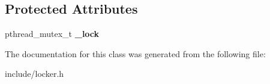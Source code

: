 \subsection*{Protected Attributes}
\begin{DoxyCompactItemize}
\item 
pthread\+\_\+mutex\+\_\+t {\bfseries \+\_\+lock}\hypertarget{class_locker_ac54c95aad09ef586cf91999f662f5b09}{}\label{class_locker_ac54c95aad09ef586cf91999f662f5b09}

\end{DoxyCompactItemize}


The documentation for this class was generated from the following file\+:\begin{DoxyCompactItemize}
\item 
include/locker.\+h\end{DoxyCompactItemize}
